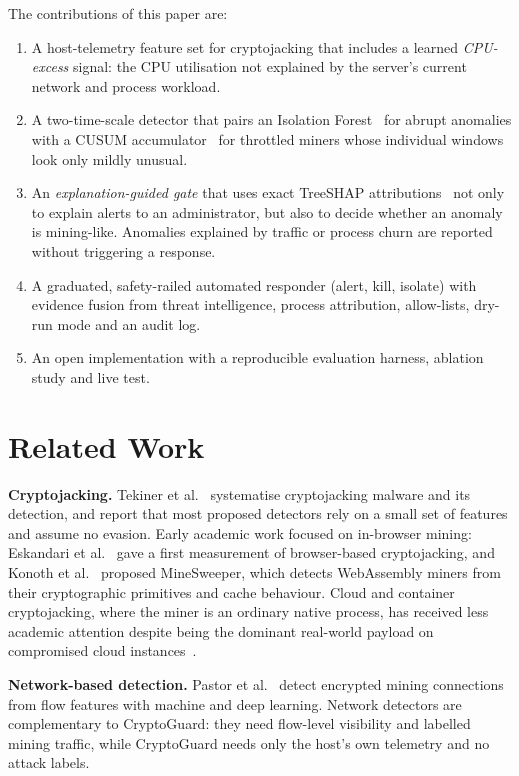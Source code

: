 \documentclass[conference]{IEEEtran}
\begin{document}
The contributions of this paper are:
\begin{enumerate}
  \item A host-telemetry feature set for cryptojacking that includes a learned \emph{CPU-excess} signal: the CPU utilisation not explained by the server's current network and process workload.
  \item A two-time-scale detector that pairs an Isolation Forest~\cite{liu2008iforest} for abrupt anomalies with a CUSUM accumulator~\cite{page1954} for throttled miners whose individual windows look only mildly unusual.
  \item An \emph{explanation-guided gate} that uses exact TreeSHAP attributions~\cite{lundberg2017,lundberg2020trees} not only to explain alerts to an administrator, but also to decide whether an anomaly is mining-like. Anomalies explained by traffic or process churn are reported without triggering a response.
  \item A graduated, safety-railed automated responder (alert, kill, isolate) with evidence fusion from threat intelligence, process attribution, allow-lists, dry-run mode and an audit log.
  \item An open implementation with a reproducible evaluation harness, ablation study and live test.
\end{enumerate}

\section{Related Work}
\textbf{Cryptojacking.} Tekiner et al.~\cite{tekiner2021sok} systematise cryptojacking malware and its detection, and report that most proposed detectors rely on a small set of features and assume no evasion. Early academic work focused on in-browser mining: Eskandari et al.~\cite{eskandari2018} gave a first measurement of browser-based cryptojacking, and Konoth et al.~\cite{konoth2018minesweeper} proposed MineSweeper, which detects WebAssembly miners from their cryptographic primitives and cache behaviour. Cloud and container cryptojacking, where the miner is an ordinary native process, has received less academic attention despite being the dominant real-world payload on compromised cloud instances~\cite{google2021threat,sysdig2022}.

\textbf{Network-based detection.} Pastor et al.~\cite{pastor2020} detect encrypted mining connections from flow features with machine and deep learning. Network detectors are complementary to CryptoGuard: they need flow-level visibility and labelled mining traffic, while CryptoGuard needs only the host's own telemetry and no attack labels.
\end{document}
